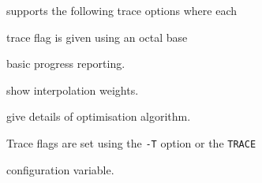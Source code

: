 









 supports the following trace options where each


trace flag is given using an octal base


\begin{optlist}


    basic progress reporting.


    show interpolation weights.


    give details of optimisation algorithm.


\end{optlist}


Trace flags are set using the \texttt{-T} option or the  \texttt{TRACE} 


configuration variable.


















